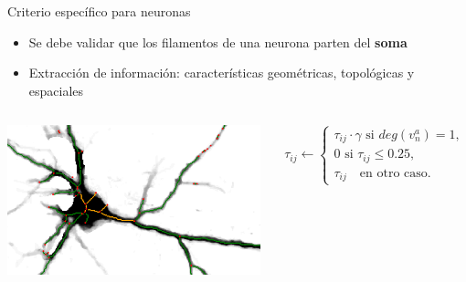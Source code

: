 \begin{frame}{Criterio espec\'ifico para neuronas}
    \begin{itemize}
        \item Se debe validar que los filamentos de una neurona parten del {\bf soma}
        \item  Extracci\'on de informaci\'on: caracter\'isticas geom\'etricas, topol\'ogicas y espaciales
    \end{itemize}
    \begin{columns}
        \begin{column}{0.55\textwidth}
        \centering
        \includegraphics[height=1.7in]{Pictures/Porta183-somaEdges-example2.png}
        \end{column}
        \begin{column}{0.45\textwidth}
            \begin{equation}
                \tau_{ij} \leftarrow
                    \begin{cases}
                     \tau_{ij} \cdot \gamma \text{ si } deg(v^{a}_{n}) = 1,  \\[3ex]
                    
                    \text{0 si } \tau_{ij} \leq 0.25, \\[3ex]
                    \tau_{ij} \quad \text{en otro caso}.
                    \end{cases}
            \end{equation}
        \end{column}
    \end{columns}
    
\end{frame}

